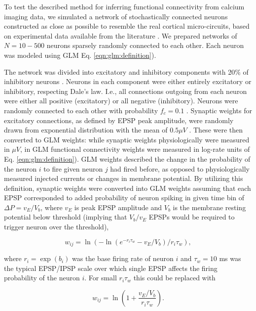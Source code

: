 To test the described method for inferring functional connectivity from calcium imaging data, we simulated a network of stochastically connected neurons constructed as close as possible to resemble the real cortical micro-circuits, based on experimental data available from the literature \cite{Braitenberg1998, Urquijo2000, Lefort2009, Sayer1990}.  We prepared networks of $N=10-500$ neurons sparsely randomly connected to each other. Each neuron was modeled using GLM Eq. \eqref{eqn:glm:definition}).

The network was divided into excitatory and inhibitory components with 20\% of inhibitory neurons \cite{Braitenberg1998, Urquijo2000}.  Neurons in each component were either entirely excitatory or inhibitory, respecting Dale's law. I.e., all connections outgoing from each neuron were either all positive (excitatory) or all negative (inhibitory). Neurons were randomly connected to each other with probability $f_c=0.1$ \cite{Braitenberg1998, Lefort2009}.  Synaptic weights for excitatory connections, as defined by EPSP peak amplitude, were randomly drawn from exponential distribution with the mean of $0.5 \mu V$ \cite{Lefort2009, Sayer1990}. These were then converted to GLM weights: while synaptic weights physiologically were measured in $\mu V$, in GLM functional connectivity weights were measured in log-rate units of Eq. \eqref{eqn:glm:definition}). GLM weights described the change in the probability of the neuron $i$ to fire given neuron $j$ had fired before, as opposed to physiologically measured injected currents or changes in membrane potential. By utilizing this definition, synaptic weights were converted into GLM weights assuming that each EPSP corresponded to added probability of neuron spiking in given time bin of $\Delta P = v_{E}/V_{b}$, where $v_E$ is peak EPSP amplitude and $V_b$ is the membrane resting potential below threshold (implying that $V_{b}/v_{E}$ EPSPs would be required to trigger neuron over the threshold), 

\begin{equation}\label{eqn:convert}
w_{ij}=\ln(-\ln(e^{-r_i\tau_w}-v_{E}/V_{b})/r_i\tau_w), 
\end{equation}

where $r_i=\exp(b_i)$ was the base firing rate of neuron $i$ and $\tau_w=10$ ms was the typical EPSP/IPSP scale over which single EPSP affects the firing probability of the neuron $i$.  For small $r_i\tau_w$ this could be replaced with

\begin{equation}\label{eqn:convert-smalldt}
w_{ij}=\ln\left(1+\frac{v_{E}/V_{b}}{r_i\tau_w}\right).
\end{equation}

